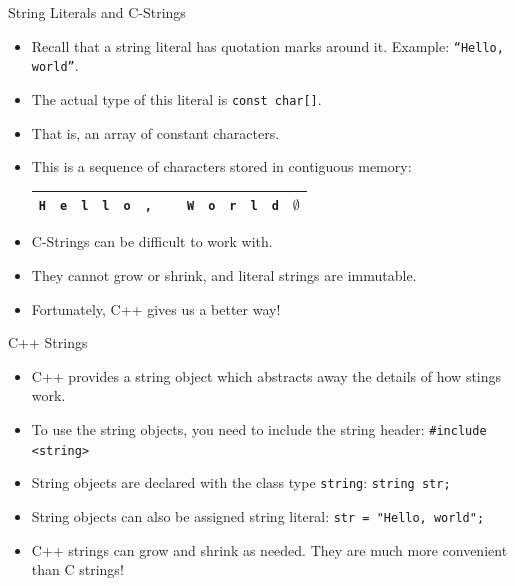 \documentclass[]{beamer}
\begin{document}
\begin{frame}{String Literals and C-Strings}
    \begin{itemize}[<+->]
        \item Recall that a string literal has quotation marks around
            it.  Example: \texttt{``Hello, world''}.
        \item The actual type of this literal is \texttt{const char[]}.
        \item That is, an array of constant characters.  
        \item This is a sequence of characters stored in contiguous
            memory:
            
            \begin{tabular}{|c|c|c|c|c|c|c|c|c|c|c|c|c|}
            \hline
            \texttt{H} & \texttt{e} & \texttt{l} & \texttt{l} & \texttt{o}
            & \texttt{,} & \texttt{ } & \texttt{W} & \texttt{o}
            & \texttt{r} & \texttt{l} & \texttt{d}& $\emptyset$ \\ 
            \hline
            \end{tabular}

        \item C-Strings can be difficult to work with.
        \item They cannot grow or shrink, and literal strings are
            immutable.
        \item Fortunately, C++ gives us a better way!
    \end{itemize}
\end{frame}

\begin{frame}{C++ Strings}
    \begin{itemize}[<+->]
        \item C++ provides a string object which abstracts away the
            details of how stings work.
        \item To use the string objects, you need to include the
            string header:
            \newline\texttt{\#include <string>}
        \item String objects are declared with the class type
            \texttt{string}: \newline\texttt{string str;}
        \item String objects can also be assigned string literal:
            \newline\texttt{str = "Hello, world";}
        \item C++ strings can grow and shrink as needed. They are much
            more convenient than C strings!
    \end{itemize}
\end{frame}
\end{document}
